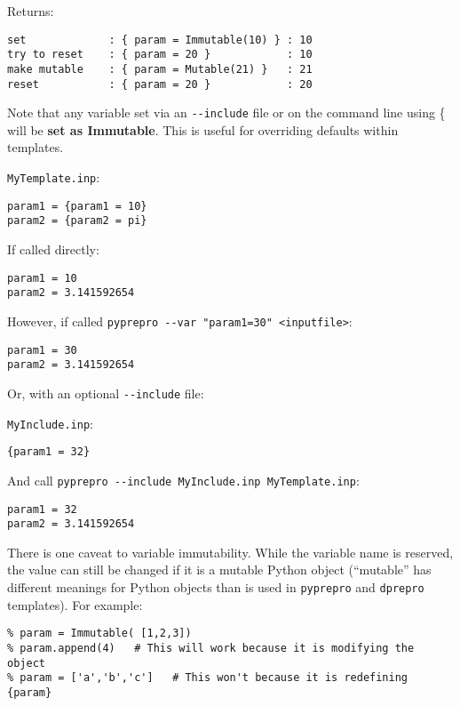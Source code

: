 Returns:

\begin{verbatim}
set             : { param = Immutable(10) } : 10
try to reset    : { param = 20 }            : 10
make mutable    : { param = Mutable(21) }   : 21
reset           : { param = 20 }            : 20
\end{verbatim}

Note that any variable set via an \texttt{-\/-include} file or on the 
command line using \{ will be \textbf{set as Immutable}.
This is useful for overriding defaults within templates.

\texttt{MyTemplate.inp}:

\begin{verbatim}
param1 = {param1 = 10}
param2 = {param2 = pi}
\end{verbatim}

If called directly:

\begin{verbatim}
param1 = 10
param2 = 3.141592654
\end{verbatim}

However, if called
\texttt{pyprepro\ -\/-var\ "param1=30"\ \textless{}inputfile\textgreater{}}:

\begin{verbatim}
param1 = 30
param2 = 3.141592654
\end{verbatim}

Or, with an optional \texttt{-\/-include} file:

\texttt{MyInclude.inp}:

\begin{verbatim}
{param1 = 32}
\end{verbatim}

And call
\texttt{pyprepro\ -\/-include\ MyInclude.inp\ MyTemplate.inp}:

\begin{verbatim}
param1 = 32
param2 = 3.141592654
\end{verbatim}

There is one caveat to variable immutability. While the variable name is 
reserved, the value can still be changed if it is a mutable Python object 
(``mutable'' has different meanings for Python objects than is used in 
\texttt{pyprepro} and \texttt{dprepro} templates). For example:

\begin{verbatim}
% param = Immutable( [1,2,3])
% param.append(4)   # This will work because it is modifying the object
% param = ['a','b','c']   # This won't because it is redefining
{param}
\end{verbatim}


